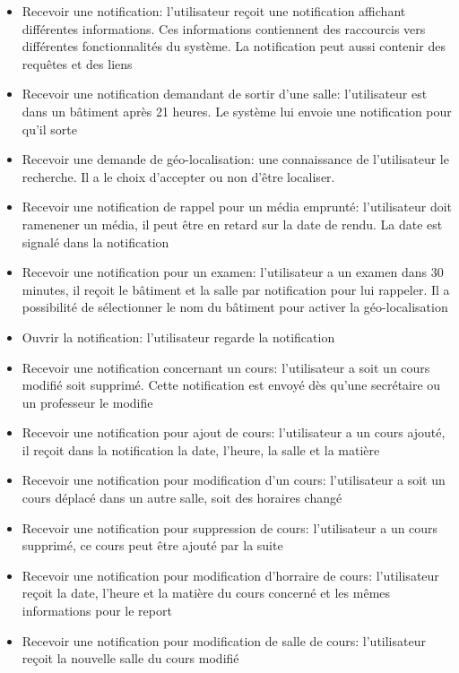 \begin{itemize}
\item Recevoir une notification: l’utilisateur reçoit une notification affichant différentes informations. Ces informations contiennent des raccourcis vers différentes fonctionnalités du système. La notification peut aussi contenir des requêtes et des liens
\item Recevoir une notification demandant de sortir d'une salle: l'utilisateur est dans un bâtiment après 21 heures. Le système lui envoie une notification pour qu'il sorte
\item Recevoir une demande de géo-localisation:  une connaissance de l'utilisateur le recherche. Il a le choix d'accepter ou non d'être localiser.
\item Recevoir une notification de rappel pour un média emprunté: l'utilisateur doit ramenener un média, il peut être en retard sur la date de rendu. La date est signalé dans la notification
\item Recevoir une notification pour un examen:  l'utilisateur a un examen dans 30 minutes, il reçoit le bâtiment et la salle par notification pour lui rappeler. Il a possibilité de sélectionner le nom du bâtiment pour activer la géo-localisation
\item Ouvrir la notification: l'utilisateur regarde la notification
\item Recevoir une notification concernant un cours: l'utilisateur a soit un cours modifié soit supprimé. Cette notification est envoyé dès qu'une secrétaire ou un professeur le modifie
\item Recevoir une notification pour ajout de cours: l'utilisateur a un cours ajouté, il reçoit dans la notification la date, l'heure, la salle et la matière
\item Recevoir une notification pour modification d'un cours: l'utilisateur a soit un cours déplacé dans un autre salle, soit des horaires changé
\item Recevoir une notification pour suppression de cours: l'utilisateur a un cours supprimé, ce cours peut être ajouté par la suite
\item Recevoir une notification pour modification d'horraire de cours: l'utilisateur reçoit la date, l'heure et la matière du cours concerné et les mêmes informations pour le report
\item Recevoir une notification pour modification de salle de cours: l'utilisateur reçoit la nouvelle salle du cours modifié
\end{itemize}
\newpage


